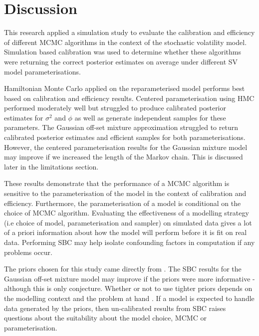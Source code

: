 \documentclass[12pt, a4paper]{article}
\begin{document}
\section{Discussion}
This research applied a simulation study to evaluate the calibration and efficiency of different MCMC algorithms in the context of the stochastic volatility model. Simulation based calibration was used to determine whether these algorithms were returning the correct posterior estimates on average under different SV model parameterisations. 

Hamiltonian Monte Carlo applied on the reparameterised model performs best based on calibration and efficiency results. Centered parameterisation using HMC performed moderately well but struggled to produce calibrated posterior estimates for $\sigma^2$ and $\phi$ as well as generate independent samples for these parameters. The Gaussian off-set mixture approximation struggled to return calibrated posterior estimates and efficient samples for both parameterisations. However, the centered parameterisation results for the Gaussian mixture model may improve if we increased the length of the Markov chain. This is discussed later in the limitations section. 

These results demonstrate that the performance of a MCMC algorithm is sensitive to the parameterisation of the model in the context of calibration and efficiency. Furthermore, the parameterisation of a model is conditional on the choice of MCMC algorithm. Evaluating the effectiveness of a modelling strategy (i.e choice of model, parameterisation and sampler) on simulated data gives a lot of a priori information about how the model will perform before it is fit on real data. Performing SBC may help isolate confounding factors in computation if any problems occur. 

The priors chosen for this study came directly from \citet{kim1998stochastic}. The SBC results for the Gaussian off-set mixture model may improve if the priors were more informative - although this is only conjecture. Whether or not to use tighter priors depends on the modelling context and the problem at hand \citep{gelman2017prior}. If a model is expected to handle data generated by the priors, then un-calibrated results from SBC raises questions about the suitability about the model choice, MCMC or parameterisation. 
\end{document}
